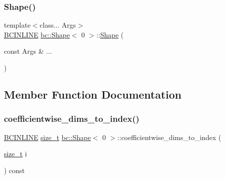 \mbox{\label{structbc_1_1Shape_3_010_01_4_aa0855fa3ec0f9fc5f40056ec3cbce50e}} 
\subsubsection{\texorpdfstring{Shape()}{Shape()}\hspace{0.1cm}{\footnotesize\ttfamily [2/2]}}
{\footnotesize\ttfamily template$<$class... Args$>$ \\
\hyperlink{common_8h_a6699e8b0449da5c0fafb878e59c1d4b1}{B\+C\+I\+N\+L\+I\+NE} \hyperlink{structbc_1_1Shape}{bc\+::\+Shape}$<$ 0 $>$\+::\hyperlink{structbc_1_1Shape}{Shape} (\begin{DoxyParamCaption}\item[{const Args \&}]{... }\end{DoxyParamCaption})\hspace{0.3cm}{\ttfamily [inline]}}



\subsection{Member Function Documentation}
\mbox{\label{structbc_1_1Shape_3_010_01_4_a3bd9f465970887d2d768c797c55af086}} 
\subsubsection{\texorpdfstring{coefficientwise\+\_\+dims\+\_\+to\+\_\+index()}{coefficientwise\_dims\_to\_index()}}
{\footnotesize\ttfamily \hyperlink{common_8h_a6699e8b0449da5c0fafb878e59c1d4b1}{B\+C\+I\+N\+L\+I\+NE} \hyperlink{structbc_1_1Shape_3_010_01_4_a7bf4db55cfc575f40871044048ea5c03}{size\+\_\+t} \hyperlink{structbc_1_1Shape}{bc\+::\+Shape}$<$ 0 $>$\+::coefficientwise\+\_\+dims\+\_\+to\+\_\+index (\begin{DoxyParamCaption}\item[{\hyperlink{structbc_1_1Shape_3_010_01_4_a7bf4db55cfc575f40871044048ea5c03}{size\+\_\+t}}]{i }\end{DoxyParamCaption}) const\hspace{0.3cm}{\ttfamily [inline]}}

